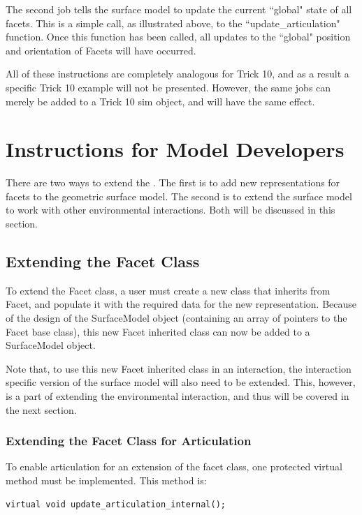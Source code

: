 The second job tells the surface model to update the current ``global" state of all facets. This is a simple
call, as illustrated above, to the ``update\_articulation" function. Once this function has been called,
all updates to the ``global" position and orientation of Facets will have occurred.

All of these instructions are completely analogous for Trick 10, and as a result
a specific Trick 10 example will not be presented. However, the same jobs can merely be
added to a Trick 10 sim object, and will have the same effect.

\section{Instructions for Model Developers}

There are two ways to extend the \ModelDesc. The first is to add
new representations for facets to the geometric surface model. The second
is to extend the surface model to work with other environmental interactions.
Both will be discussed in this section.

\subsection{Extending the Facet Class}

To extend the Facet class, a user must create a new class that inherits from
Facet, and populate it with the required data for the new representation.
Because of the design of the SurfaceModel object (containing an array of
pointers to the Facet base class), this new Facet inherited class can now be
added to a SurfaceModel object.

Note that, to use this new Facet inherited class in an interaction, the
interaction specific version of the surface model will also need to be extended.
This, however, is a part of extending the environmental interaction, and thus
will be covered in the next section.

\subsubsection{Extending the Facet Class for Articulation}

To enable articulation for an extension of the facet class, one protected virtual method must be implemented. This method is:

\begin{verbatim}
virtual void update_articulation_internal();
\end{verbatim}

